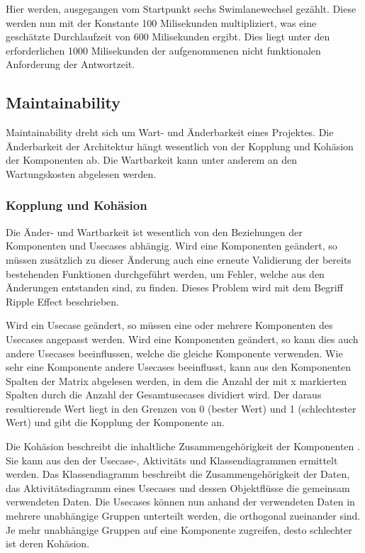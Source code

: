 Hier werden, ausgegangen vom Startpunkt sechs Swimlanewechsel gezählt. Diese werden nun mit der Konstante 100 Milisekunden multipliziert, was eine geschätzte Durchlaufzeit von 600 Milisekunden ergibt. Dies liegt unter den erforderlichen 1000 Milisekunden der aufgenommenen nicht funktionalen Anforderung der Antwortzeit.

\subsection{Maintainability}
Maintainability dreht sich um Wart- und Änderbarkeit eines Projektes. Die Änderbarkeit der Architektur hängt wesentlich von der Kopplung und Kohäsion der Komponenten ab. Die Wartbarkeit kann unter anderem an den Wartungskosten abgelesen werden.

\subsubsection{Kopplung und Kohäsion}
Die Änder- und Wartbarkeit ist wesentlich von den Beziehungen der Komponenten und Usecases abhängig. Wird eine Komponenten geändert, so müssen zusätzlich zu dieser Änderung auch eine erneute Validierung der bereits bestehenden Funktionen durchgeführt werden, um Fehler, welche aus den Änderungen entstanden sind, zu finden. Dieses Problem wird mit dem Begriff Ripple Effect beschrieben. \cite[S. 3]{ripple}

Wird ein Usecase geändert, so müssen eine oder mehrere Komponenten des Usecases angepasst werden. Wird eine Komponenten geändert, so kann dies auch andere Usecases beeinflussen, welche die gleiche Komponente verwenden. Wie sehr eine Komponente andere Usecases beeinflusst, kann aus den Komponenten Spalten der Matrix abgelesen werden, in dem die Anzahl der mit x markierten Spalten durch die Anzahl der Gesamtusecases dividiert wird. Der daraus resultierende Wert liegt in den Grenzen von 0 (bester Wert) und 1 (schlechtester Wert) und gibt die Kopplung der Komponente an. \cite[S. 164]{effektiv}

Die Kohäsion beschreibt die inhaltliche Zusammengehörigkeit der Komponenten \cite[S. 164]{effektiv}. Sie kann aus den der Usecase-, Aktivitäts und Klassendiagrammen ermittelt werden. Das Klassendiagramm beschreibt die Zusammengehörigkeit der Daten, das Aktivitätsdiagramm eines Usecases und dessen Objektflüsse die gemeinsam verwendeten Daten. Die Usecases können nun anhand der verwendeten Daten in mehrere unabhängige Gruppen unterteilt werden, die orthogonal zueinander sind. Je mehr unabhängige Gruppen auf eine Komponente zugreifen, desto schlechter ist deren Kohäsion.

